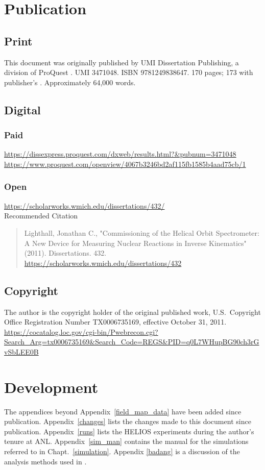 \section{Publication}
\subsection{Print}
This document was originally published by UMI Dissertation Publishing, a division of ProQuest \cite{Lighthall_2011}. UMI 3471048. ISBN 9781249838647. 170 pages; 173 with publisher's . Approximately 64,000 words.

\subsection{Digital}
\subsubsection{Paid}
\noindent\url{https://dissexpress.proquest.com/dxweb/results.html?&pubnum=3471048}\\
\noindent\url{https://www.proquest.com/openview/4067b3246bd2af115fb1585b4aad75cb/1}
\subsubsection{Open}
\noindent\url{https://scholarworks.wmich.edu/dissertations/432/}\\
Recommended Citation
\begin{quote}
Lighthall, Jonathan C., "Commissioning of the Helical Orbit Spectrometer: A New Device for Measuring Nuclear Reactions in Inverse Kinematics" (2011). Dissertations. 432.\\
\url{https://scholarworks.wmich.edu/dissertations/432}
\end{quote}

\subsection{Copyright}
The author is the copyright holder of the original published work, U.S.\ Copyright Office Registration Number TX0006735169, effective October 31, 2011.
\noindent\url{https://cocatalog.loc.gov/cgi-bin/Pwebrecon.cgi?Search_Arg=tx0006735169&Search_Code=REGS&PID=q0L7WHupBG90ch3rGvSbLEE0B}

\section{Development}
The appendices beyond Appendix~\ref{field_map_data} have been added since publication.
Appendix~\ref{changes} lists the changes made to this document since publication.
Appendix~\ref{runs} lists the HELIOS experiments during the author's tenure at ANL.
Appendix~\ref{sim_man} contains the manual for the simulations referred to in Chapt.~\ref{simulation}.
Appendix \ref{badang} is a discussion of the analysis methods used in \cite{Schiffer_2010}.

